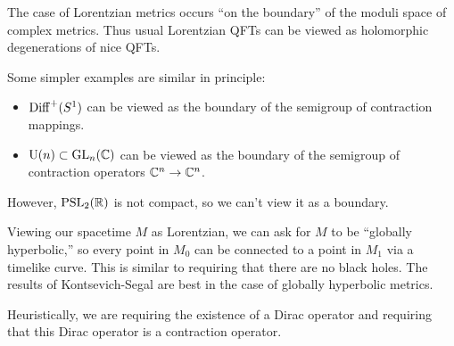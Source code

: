 The case of Lorentzian metrics occurs ``on the boundary'' of the moduli space of complex metrics.
Thus usual Lorentzian QFTs can be viewed as holomorphic degenerations of nice QFTs.

Some simpler examples are similar in principle:
\begin{itemize}
	\item $\operatorname{Diff}^+(S^1)$ can be viewed as the boundary of the semigroup of contraction mappings.
	\item $\mathrm{U}(n) \subset \mathrm{GL}_n(\mathbb{C})$ can be viewed as the boundary of the semigroup of contraction operators $\mathbb{C}^n \to \mathbb{C}^n$.
\end{itemize}

However, $\mathrm{PSL}_2(\mathbb{R})$ is not compact, so we can't view it as a boundary.

Viewing our spacetime $M$ as Lorentzian, we can ask for $M$ to be ``globally hyperbolic,'' so every point in $M_0$ can be connected to a point in $M_1$ via a timelike curve.
This is similar to requiring that there are no black holes.
The results of Kontsevich-Segal are best in the case of globally hyperbolic metrics.

Heuristically, we are requiring the existence of a Dirac operator and requiring that this Dirac operator is a contraction operator.
